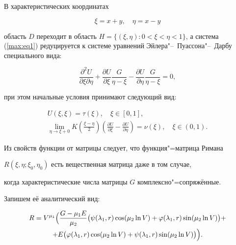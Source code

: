 В характеристических координатах 

 \begin{equation}

 \label{max:char}

  \xi=x+y,\quad   \eta=x-y

\end{equation}

область $D$ переходит в область $H=\{(\xi, \eta) : 0<\xi<\eta<1\}$, а система (\ref{max:eq1}) редуцируется к системе уравнений Эйлера"--~Пуассона"--~Дарбу специального вида:

\begin{equation}

  \label{max:eq_char}

  \frac{\partial^{2}U}{\partial \xi \partial \eta }+

  \frac{\partial U}{\partial \xi} \frac{G}{\eta-\xi}-

  \frac{\partial U}{\partial \eta} \frac{G}{\eta-\xi}=0,

\end{equation}

при этом начальные условия принимают следующий вид:

\begin{gather}

\label{max:kr1_char}

 U(\xi,\xi)=\tau(\xi),\quad \xi \in [0, 1],

\\

\label{max:kr2_char}

 \lim_{\eta \to \xi +0} K \left( \frac{\xi-\eta}{2} \right)\left(\frac{\partial U}{\partial \xi}-\frac{\partial U}{\partial \eta}\right)=\nu(\xi),\quad \xi \in (0, 1).

\end{gather}



Из свойств функции от матрицы \cite{mix:gant} следует, что функция"=матрица Римана  \linebreak

$R(\xi, \eta; \xi_0, \eta_0)$ есть вещественная матрица даже в том случае, 

когда характеристические числа матрицы $G$ комплексно"=сопряжённые.

 Запишем её аналитический вид:

\begin{multline*}


R=V^{\mu_1} \Bigl(

\frac{G-\mu_1 E}{\mu_2}\bigl(\psi(\lambda_1,r)\cos (\mu_2 \ln V)

+\varphi(\lambda_1,r) \sin(\mu_2 \ln V) \bigr)+ 

\\

+  E\bigl(\varphi(\lambda_1,r)\cos (\mu_2 \ln V) 

+\psi(\lambda_1,r) \sin(\mu_2 \ln V)

\bigr)

\Bigr).

\end{multline*}

